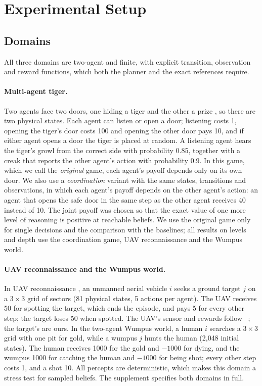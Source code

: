 \documentclass{article}
\newcommand{\citet}[1]{\citeauthor{#1}~\shortcite{#1}}
\begin{document}
\section{Experimental Setup}
\label{sec:setup}

\subsection{Domains}

All three domains are two-agent and finite, with explicit transition, observation and reward functions, which both the planner and the exact references require.

\paragraph{Multi-agent tiger.} Two agents face two doors, one hiding a tiger and the other a prize \cite{gmytrasiewicz2005framework}, so there are two physical states. Each agent can listen or open a door; listening costs 1, opening the tiger's door costs 100 and opening the other door pays 10, and if either agent opens a door the tiger is placed at random. A listening agent hears the tiger's growl from the correct side with probability 0.85, together with a creak that reports the other agent's action with probability 0.9. In this game, which we call the \emph{original} game, each agent's payoff depends only on its own door. We also use a \emph{coordination} variant with the same states, transitions and observations, in which each agent's payoff depends on the other agent's action: an agent that opens the safe door in the same step as the other agent receives 40 instead of 10. The joint payoff was chosen so that the exact value of one more level of reasoning is positive at reachable beliefs. We use the original game only for single decisions and the comparison with the baselines; all results on levels and depth use the coordination game, UAV reconnaissance and the Wumpus world.

\paragraph{UAV reconnaissance and the Wumpus world.} In UAV reconnaissance \cite{doshi2009monte}, an unmanned aerial vehicle $i$ seeks a ground target $j$ on a $3 \times 3$ grid of sectors (81 physical states, 5 actions per agent). The UAV receives 50 for spotting the target, which ends the episode, and pays 5 for every other step; the target loses 50 when spotted. The UAV's sensor and rewards follow \citet{zeng2012exploiting}; the target's are ours. In the two-agent Wumpus world, a human $i$ searches a $3 \times 3$ grid with one pit for gold, while a wumpus $j$ hunts the human (2{,}048 initial states). The human receives 1000 for the gold and $-1000$ for dying, and the wumpus 1000 for catching the human and $-1000$ for being shot; every other step costs 1, and a shot 10. All percepts are deterministic, which makes this domain a stress test for sampled beliefs. The supplement specifies both domains in full.
\end{document}
